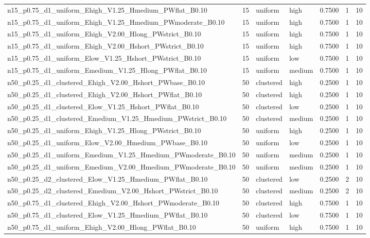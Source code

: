 \begin{tabular}{lrllrrr}
n15_p0.75_d1_uniform_Ehigh_V1.25_Hmedium_PWflat_B0.10 & 15 & uniform & high & 0.7500 & 1 & 10 \\
n15_p0.75_d1_uniform_Ehigh_V1.25_Hmedium_PWmoderate_B0.10 & 15 & uniform & high & 0.7500 & 1 & 10 \\
n15_p0.75_d1_uniform_Ehigh_V2.00_Hlong_PWstrict_B0.10 & 15 & uniform & high & 0.7500 & 1 & 10 \\
n15_p0.75_d1_uniform_Ehigh_V2.00_Hshort_PWstrict_B0.10 & 15 & uniform & high & 0.7500 & 1 & 10 \\
n15_p0.75_d1_uniform_Elow_V1.25_Hshort_PWstrict_B0.10 & 15 & uniform & low & 0.7500 & 1 & 10 \\
n15_p0.75_d1_uniform_Emedium_V1.25_Hlong_PWflat_B0.10 & 15 & uniform & medium & 0.7500 & 1 & 10 \\
n50_p0.25_d1_clustered_Ehigh_V2.00_Hshort_PWbase_B0.10 & 50 & clustered & high & 0.2500 & 1 & 10 \\
n50_p0.25_d1_clustered_Ehigh_V2.00_Hshort_PWflat_B0.10 & 50 & clustered & high & 0.2500 & 1 & 10 \\
n50_p0.25_d1_clustered_Elow_V1.25_Hshort_PWflat_B0.10 & 50 & clustered & low & 0.2500 & 1 & 10 \\
n50_p0.25_d1_clustered_Emedium_V1.25_Hmedium_PWstrict_B0.10 & 50 & clustered & medium & 0.2500 & 1 & 10 \\
n50_p0.25_d1_uniform_Ehigh_V1.25_Hlong_PWstrict_B0.10 & 50 & uniform & high & 0.2500 & 1 & 10 \\
n50_p0.25_d1_uniform_Elow_V2.00_Hmedium_PWbase_B0.10 & 50 & uniform & low & 0.2500 & 1 & 10 \\
n50_p0.25_d1_uniform_Emedium_V1.25_Hmedium_PWmoderate_B0.10 & 50 & uniform & medium & 0.2500 & 1 & 10 \\
n50_p0.25_d1_uniform_Emedium_V2.00_Hmedium_PWmoderate_B0.10 & 50 & uniform & medium & 0.2500 & 1 & 10 \\
n50_p0.25_d2_clustered_Elow_V1.25_Hmedium_PWflat_B0.10 & 50 & clustered & low & 0.2500 & 2 & 10 \\
n50_p0.25_d2_clustered_Emedium_V2.00_Hshort_PWstrict_B0.10 & 50 & clustered & medium & 0.2500 & 2 & 10 \\
n50_p0.75_d1_clustered_Ehigh_V2.00_Hshort_PWmoderate_B0.10 & 50 & clustered & high & 0.7500 & 1 & 10 \\
n50_p0.75_d1_clustered_Elow_V1.25_Hmedium_PWflat_B0.10 & 50 & clustered & low & 0.7500 & 1 & 10 \\
n50_p0.75_d1_uniform_Ehigh_V2.00_Hlong_PWflat_B0.10 & 50 & uniform & high & 0.7500 & 1 & 10 \\

\end{tabular}
